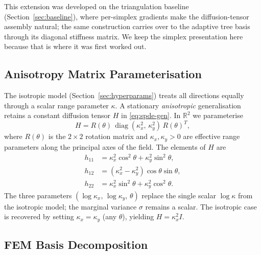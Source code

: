 \documentclass[11pt]{article}
\DeclareMathOperator{\diag}{diag}
\newcommand{\R}{\mathbb{R}}
\begin{document}
This extension was developed on the triangulation baseline
(Section~\ref{sec:baseline}), where per-simplex gradients make the
diffusion-tensor assembly natural; the same construction carries over to the
adaptive tree basis through its diagonal stiffness matrix.  We keep the simplex
presentation here because that is where it was first worked out.

\subsection{Anisotropy Matrix Parameterisation}

The isotropic model (Section~\ref{sec:hyperparams}) treats all directions
equally through a scalar range parameter $\kappa$.  A stationary
\emph{anisotropic} generalisation retains a constant diffusion tensor $H$ in
\eqref{eq:spde-gen}.  In $\R^2$ we parameterise
\begin{equation}
  H = R(\theta)\,\diag(\kappa_x^2,\,\kappa_y^2)\,R(\theta)^T,
  \label{eq:H-param}
\end{equation}
where $R(\theta)$ is the $2\times 2$ rotation matrix and $\kappa_x, \kappa_y > 0$
are effective range parameters along the principal axes of the field.
The elements of $H$ are
\begin{align}
  h_{11} &= \kappa_x^2\cos^2\!\theta + \kappa_y^2\sin^2\!\theta, \nonumber\\
  h_{12} &= (\kappa_x^2 - \kappa_y^2)\cos\theta\sin\theta,           \label{eq:H-components} \\
  h_{22} &= \kappa_x^2\sin^2\!\theta + \kappa_y^2\cos^2\!\theta.    \nonumber
\end{align}
The three parameters $(\log\kappa_x,\, \log\kappa_y,\, \theta)$ replace the
single scalar $\log\kappa$ from the isotropic model; the marginal variance
$\sigma$ remains a scalar.  The isotropic case is recovered by setting
$\kappa_x = \kappa_y$ (any $\theta$), yielding $H = \kappa_x^2 I$.

\subsection{FEM Basis Decomposition}
\label{sec:aniso-fem}
\end{document}
